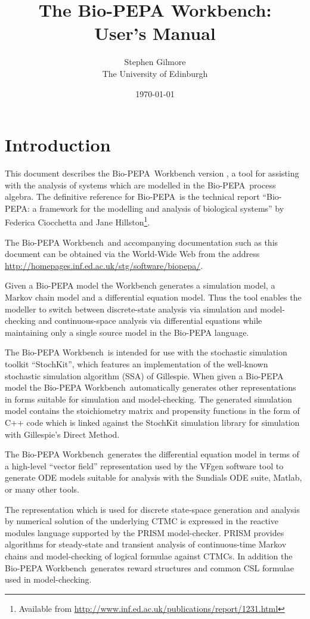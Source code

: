 \documentclass[11pt,a4paper]{article}
\newcommand{\BioPEPA}{Bio-PEPA}
\newcommand{\BPWB}{{\BioPEPA} Workbench}
\begin{document}
\sloppy
\title{\bf The \BPWB:\\ User's Manual}
\author{Stephen Gilmore\\
  The University of Edinburgh}
\date{\today}
\maketitle
\tableofcontents

\section{Introduction}
This document describes the \BioPEPA\ Workbench version
, a tool for assisting with the analysis of systems
which are modelled in the \BioPEPA\ process algebra.  The definitive
reference for \BioPEPA\ is the technical report ``Bio-PEPA: a
framework for the modelling and analysis of biological systems'' by
Federica Ciocchetta and Jane Hillston\footnote{Available from
  \url{http://www.inf.ed.ac.uk/publications/report/1231.html}}.

The \BPWB\ and accompanying documentation such as this document can
be obtained via the World-Wide Web from the address
\url{http://homepages.inf.ed.ac.uk/stg/software/biopepa/}.

Given a Bio-PEPA model the Workbench generates a simulation model, a
Markov chain model and a differential equation model.  Thus the tool
enables the modeller to switch between discrete-state analysis via
simulation and model-checking and continuous-space analysis via
differential equations while maintaining only a single source model in
the Bio-PEPA language.

The \BPWB\ is intended for use with the stochastic simulation toolkit
``StochKit'', which features an implementation of the well-known
stochastic simulation algorithm (SSA) of Gillespie.
When given a Bio-PEPA model the \BPWB\ automatically generates other
representations in forms suitable for simulation and model-checking.
The generated simulation model contains the stoichiometry matrix and
propensity functions in the form of C++ code which is linked against
the StochKit simulation library for simulation with
Gillespie's Direct Method. 

The \BPWB\ generates the differential equation model in terms of a
high-level ``vector field'' representation used by the VFgen software
tool to generate ODE models suitable for analysis with the Sundials
ODE suite, Matlab, or many other tools.

The representation which is used for discrete state-space generation
and analysis by numerical solution of the underlying CTMC is expressed
in the reactive modules language supported by the PRISM model-checker.
PRISM provides algorithms for steady-state and transient analysis of
continuous-time Markov chains and model-checking of logical formulae
against CTMCs.  In addition the \BPWB\ generates reward structures and
common CSL formulae used in model-checking.
\end{document}
